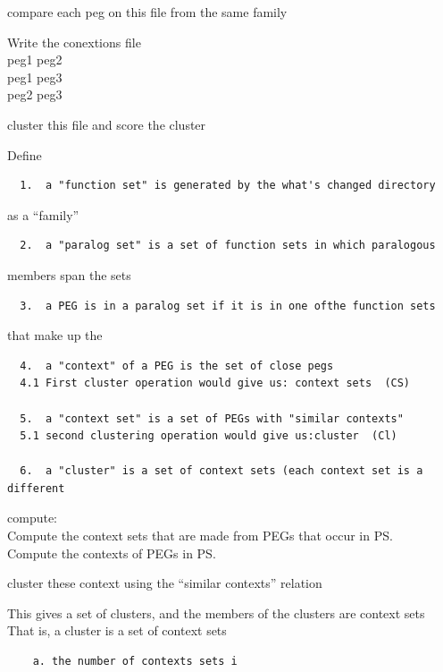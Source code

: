 \documentclass[12pt,twoside]{reedthesis}
\begin{document}
  compare each peg on this file from the same family
  
  Write the conextions file\\
  peg1 peg2\\
  peg1 peg3\\
  peg2 peg3
  
  cluster this file and score the cluster
  
  Define
  
  \begin{verbatim}
  1.  a "function set" is generated by the what's changed directory  
  \end{verbatim}
  
  as a ``family''
  
  \begin{verbatim}
  2.  a "paralog set" is a set of function sets in which paralogous  
  \end{verbatim}
  
  members span the sets
  
  \begin{verbatim}
  3.  a PEG is in a paralog set if it is in one ofthe function sets  
  \end{verbatim}
  
  that make up the
  
  \begin{verbatim}
  4.  a "context" of a PEG is the set of close pegs  
  4.1 First cluster operation would give us: context sets  (CS)  
  
  5.  a "context set" is a set of PEGs with "similar contexts"  
  5.1 second clustering operation would give us:cluster  (Cl)  
  
  6.  a "cluster" is a set of context sets (each context set is a different   
  \end{verbatim}
  
  compute:\\
  Compute the context sets that are made from PEGs that occur in PS.\\
  Compute the contexts of PEGs in PS.
  
  cluster these context using the ``similar contexts'' relation
  
  This gives a set of clusters, and the members of the clusters are
  context sets\\
  That is, a cluster is a set of context sets
  
  \begin{verbatim}
    a. the number of contexts sets i  
  \end{verbatim}
  
\end{document}
